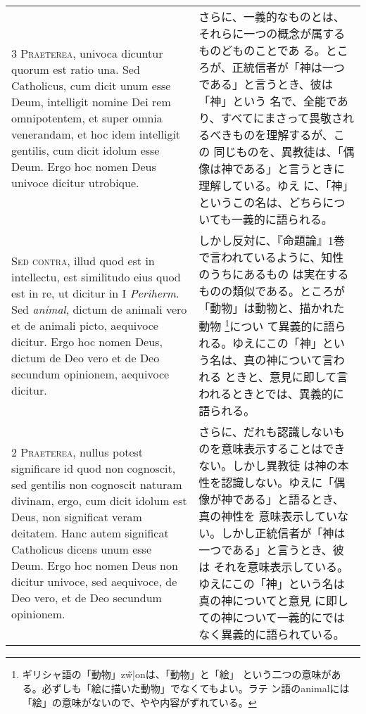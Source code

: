 \documentclass[paper=a4paper,fontsize=10pt,jafontsize=9pt,titlepage]{jlreq}
\begin{document}
\begin{longtable}{p{21em}p{21em}}
\\

{\scshape 3 Praeterea}, univoca dicuntur quorum est ratio una. Sed
Catholicus, cum dicit unum esse Deum, intelligit nomine Dei rem
omnipotentem, et super omnia venerandam, et hoc idem intelligit
gentilis, cum dicit idolum esse Deum. Ergo hoc nomen Deus univoce
dicitur utrobique.

&

さらに、一義的なものとは、それらに一つの概念が属するものどものことであ
る。ところが、正統信者が「神は一つである」と言うとき、彼は「神」という
名で、全能であり、すべてにまさって畏敬されるべきものを理解するが、この
同じものを、異教徒は、「偶像は神である」と言うときに理解している。ゆえ
に、「神」というこの名は、どちらについても一義的に語られる。

\\

{\scshape Sed contra}, illud quod est in intellectu, est similitudo
eius quod est in re, ut dicitur in I {\itshape Periherm}. Sed
{\itshape animal}, dictum de animali vero et de animali picto,
aequivoce dicitur. Ergo hoc nomen Deus, dictum de Deo vero et de Deo
secundum opinionem, aequivoce dicitur.

&

しかし反対に、『命題論』1巻で言われているように、知性のうちにあるもの
は実在するものの類似である。ところが「動物」は動物と、描かれた動物
\footnote{ギリシャ語の「動物」\textgreek{z\~w|on}は、「動物」と「絵」
という二つの意味がある。必ずしも「絵に描いた動物」でなくてもよい。ラテ
ン語のanimalには「絵」の意味がないので、やや内容がずれている。}につい
て異義的に語られる。ゆえにこの「神」という名は、真の神について言われる
ときと、意見に即して言われるときとでは、異義的に語られる。

\\

{\scshape 2 Praeterea}, nullus potest significare id quod non
cognoscit, sed gentilis non cognoscit naturam divinam, ergo, cum dicit
idolum est Deus, non significat veram deitatem. Hanc autem significat
Catholicus dicens unum esse Deum. Ergo hoc nomen Deus non dicitur
univoce, sed aequivoce, de Deo vero, et de Deo secundum opinionem.

&

さらに、だれも認識しないものを意味表示することはできない。しかし異教徒
は神の本性を認識しない。ゆえに「偶像が神である」と語るとき、真の神性を
意味表示していない。しかし正統信者が「神は一つである」と言うとき、彼は
それを意味表示している。ゆえにこの「神」という名は真の神についてと意見
に即しての神について一義的にではなく異義的に語られている。


\end{longtable}
\end{document}
